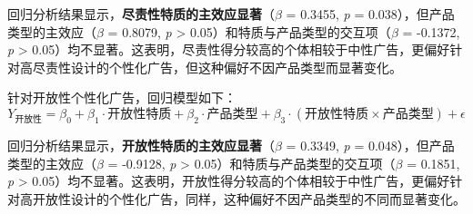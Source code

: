 回归分析结果显示，\textbf{尽责性特质的主效应显著}（\textit{$\beta$} = 0.3455, \textit{p} = 0.038），但产品类型的主效应（\textit{$\beta$} = 0.8079, \textit{p} > 0.05）和特质与产品类型的交互项（\textit{$\beta$} = -0.1372, \textit{p} > 0.05）均不显著。这表明，尽责性得分较高的个体相较于中性广告，更偏好针对高尽责性设计的个性化广告，但这种偏好不因产品类型而显著变化。

针对开放性个性化广告，回归模型如下： \begin{equation} Y_{\text{开放性}} = \beta_0 + \beta_1 \cdot \text{开放性特质} + \beta_2 \cdot \text{产品类型} + \beta_3 \cdot (\text{开放性特质} \times \text{产品类型}) + \epsilon \end{equation}

回归分析结果显示，\textbf{开放性特质的主效应显著}（\textit{$\beta$} = 0.3349, \textit{p} = 0.048），但产品类型的主效应（\textit{$\beta$} = -0.9128, \textit{p} > 0.05）和特质与产品类型的交互项（\textit{$\beta$} = 0.1851, \textit{p} > 0.05）均不显著。这表明，开放性得分较高的个体相较于中性广告，更偏好针对高开放性设计的个性化广告，同样，这种偏好不因产品类型的不同而显著变化。